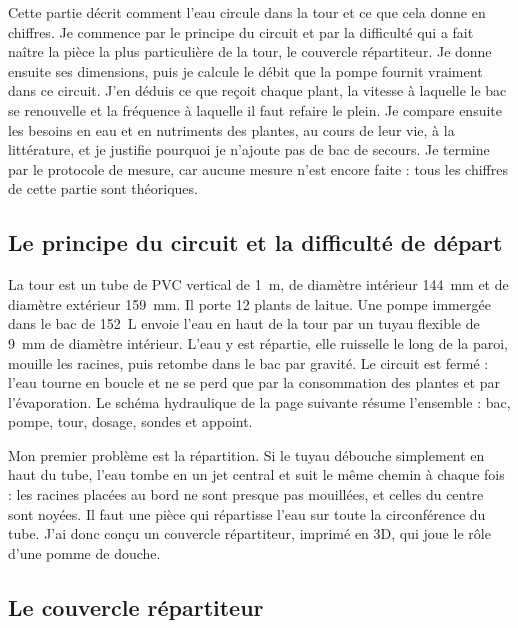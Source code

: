 
Cette partie décrit comment l'eau circule dans la tour et ce que cela donne en chiffres. Je commence par le principe du circuit et par la difficulté qui a fait naître la pièce la plus particulière de la tour, le couvercle répartiteur. Je donne ensuite ses dimensions, puis je calcule le débit que la pompe fournit vraiment dans ce circuit. J'en déduis ce que reçoit chaque plant, la vitesse à laquelle le bac se renouvelle et la fréquence à laquelle il faut refaire le plein. Je compare ensuite les besoins en eau et en nutriments des plantes, au cours de leur vie, à la littérature, et je justifie pourquoi je n'ajoute pas de bac de secours. Je termine par le protocole de mesure, car aucune mesure n'est encore faite : tous les chiffres de cette partie sont théoriques.

\subsection{Le principe du circuit et la difficulté de départ}

La tour est un tube de PVC vertical de \qty{1}{m}, de diamètre intérieur \qty{144}{mm} et de diamètre extérieur \qty{159}{mm}. Il porte 12 plants de laitue. Une pompe immergée dans le bac de \qty{152}{L} envoie l'eau en haut de la tour par un tuyau flexible de \qty{9}{mm} de diamètre intérieur. L'eau y est répartie, elle ruisselle le long de la paroi, mouille les racines, puis retombe dans le bac par gravité. Le circuit est fermé : l'eau tourne en boucle et ne se perd que par la consommation des plantes et par l'évaporation. Le schéma hydraulique de la page suivante résume l'ensemble : bac, pompe, tour, dosage, sondes et appoint.


Mon premier problème est la répartition. Si le tuyau débouche simplement en haut du tube, l'eau tombe en un jet central et suit le même chemin à chaque fois : les racines placées au bord ne sont presque pas mouillées, et celles du centre sont noyées. Il faut une pièce qui répartisse l'eau sur toute la circonférence du tube. J'ai donc conçu un couvercle répartiteur, imprimé en 3D, qui joue le rôle d'une pomme de douche.

\subsection{Le couvercle répartiteur}

